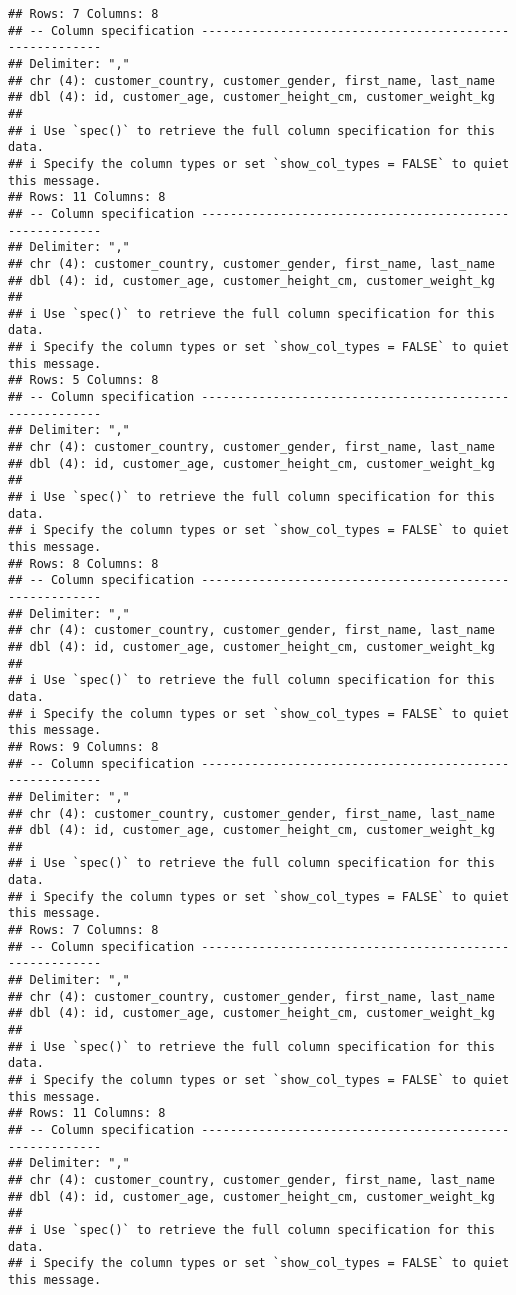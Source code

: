\documentclass[
]{article}
\begin{document}
\begin{verbatim}
## Rows: 7 Columns: 8
## -- Column specification --------------------------------------------------------
## Delimiter: ","
## chr (4): customer_country, customer_gender, first_name, last_name
## dbl (4): id, customer_age, customer_height_cm, customer_weight_kg
## 
## i Use `spec()` to retrieve the full column specification for this data.
## i Specify the column types or set `show_col_types = FALSE` to quiet this message.
## Rows: 11 Columns: 8
## -- Column specification --------------------------------------------------------
## Delimiter: ","
## chr (4): customer_country, customer_gender, first_name, last_name
## dbl (4): id, customer_age, customer_height_cm, customer_weight_kg
## 
## i Use `spec()` to retrieve the full column specification for this data.
## i Specify the column types or set `show_col_types = FALSE` to quiet this message.
## Rows: 5 Columns: 8
## -- Column specification --------------------------------------------------------
## Delimiter: ","
## chr (4): customer_country, customer_gender, first_name, last_name
## dbl (4): id, customer_age, customer_height_cm, customer_weight_kg
## 
## i Use `spec()` to retrieve the full column specification for this data.
## i Specify the column types or set `show_col_types = FALSE` to quiet this message.
## Rows: 8 Columns: 8
## -- Column specification --------------------------------------------------------
## Delimiter: ","
## chr (4): customer_country, customer_gender, first_name, last_name
## dbl (4): id, customer_age, customer_height_cm, customer_weight_kg
## 
## i Use `spec()` to retrieve the full column specification for this data.
## i Specify the column types or set `show_col_types = FALSE` to quiet this message.
## Rows: 9 Columns: 8
## -- Column specification --------------------------------------------------------
## Delimiter: ","
## chr (4): customer_country, customer_gender, first_name, last_name
## dbl (4): id, customer_age, customer_height_cm, customer_weight_kg
## 
## i Use `spec()` to retrieve the full column specification for this data.
## i Specify the column types or set `show_col_types = FALSE` to quiet this message.
## Rows: 7 Columns: 8
## -- Column specification --------------------------------------------------------
## Delimiter: ","
## chr (4): customer_country, customer_gender, first_name, last_name
## dbl (4): id, customer_age, customer_height_cm, customer_weight_kg
## 
## i Use `spec()` to retrieve the full column specification for this data.
## i Specify the column types or set `show_col_types = FALSE` to quiet this message.
## Rows: 11 Columns: 8
## -- Column specification --------------------------------------------------------
## Delimiter: ","
## chr (4): customer_country, customer_gender, first_name, last_name
## dbl (4): id, customer_age, customer_height_cm, customer_weight_kg
## 
## i Use `spec()` to retrieve the full column specification for this data.
## i Specify the column types or set `show_col_types = FALSE` to quiet this message.
\end{verbatim}
\end{document}
